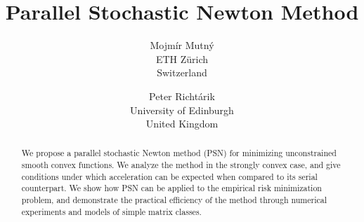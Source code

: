 \documentclass[11pt]{article}
\begin{document}
	
	
		\title{\bf Parallel Stochastic Newton Method}
		

		

	
	\author{Mojm\'{i}r   Mutn\'{y}	\\
		ETH Z\"urich\\
		Switzerland\\		
		\and
		Peter Richt\'{a}rik \\ University of Edinburgh \\ United Kingdom }
	
	\maketitle
	
	\begin{abstract}
	We propose a parallel stochastic Newton method (PSN) for minimizing unconstrained smooth convex functions. We analyze the method in the strongly convex case, and give conditions under which acceleration can be expected when compared to its serial counterpart. We show how PSN can be applied to the empirical risk minimization problem, and demonstrate the practical efficiency of the method through numerical experiments and models of simple matrix classes. 
	
		
	\end{abstract}
	
	
\end{document}
